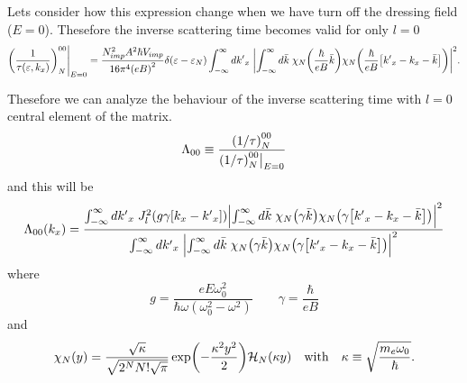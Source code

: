\noindent
Lets consider how this expression change when we have turn off the dressing field ($E = 0$). Thesefore the inverse scattering time becomes valid for only $l=0$
\begin{equation} \label{5.3}
  \begin{aligned}
    \qty(\frac{1}{\tau(\varepsilon,k_x)})^{00}_{N}\Bigg|_{E=0}  =
    \frac { N_{imp}^2 A^2 \hbar V_{imp}}{16\pi^4 \qty(eB)^2}
    \delta(\varepsilon - \varepsilon_{N})
    \int_{-\infty}^{\infty} d {k'}_x \;
    \qty|
    \int_{-\infty}^{\infty} d\bar{k} \;
    {\chi}_{N}\qty(\frac{\hbar}{eB}\bar{k})
    {\chi}_{N}\qty(\frac{\hbar}{eB} \qty[{k'}_x - {k}_x - \bar{k}])|^2.
  \end{aligned}
\end{equation}

\noindent
Thesefore we can analyze the behaviour of the inverse scattering time with
$l=0$ central element of the matrix.
\begin{equation} \label{5.4}
    \Lambda_{00} \equiv
    \frac{\qty(1/\tau)^{00}_{N}}{\qty(1/\tau)^{00}_{N}\big|_{E=0}}
\end{equation}
and this will be
\begin{equation} \label{5.5}
    \Lambda_{00}(k_x) =
    \frac
    {\int_{-\infty}^{\infty} d {k'}_x \;
    J_l^2\qty(g\gamma[{k}_x - {k'}_x])
    \qty|
    \int_{-\infty}^{\infty} d\bar{k} \;
    {\chi}_{N}\qty(\gamma\bar{k})
    {\chi}_{N}\qty(\gamma\qty[{k'}_x - {k}_x - \bar{k}])|^2}
    {\int_{-\infty}^{\infty} d {k'}_x \;
    \qty|
    \int_{-\infty}^{\infty} d\bar{k} \;
    {\chi}_{N}\qty(\gamma\bar{k})
    {\chi}_{N}\qty(\gamma \qty[{k'}_x - {k}_x - \bar{k}])|^2}
\end{equation}
where
\begin{equation} \label{5.6}
    g = \frac{eE\omega_0^2}{\hbar\omega(\omega_0^2 - \omega^2)} \quad\quad
    \gamma = \frac{\hbar}{eB}
\end{equation}
and
\begin{equation} \label{5.7}
  \chi_N(y) = \frac{\sqrt{\kappa}}{\sqrt{2^{N}N!\sqrt{\pi}}}
  \exp(-\frac{\kappa^2 y^2}{2})
  \mathcal{H}_N\qty(\kappa y) \quad \text{with} \quad
  \kappa \equiv \sqrt{\frac{m_e \omega_0}{\hbar}}.
\end{equation}

